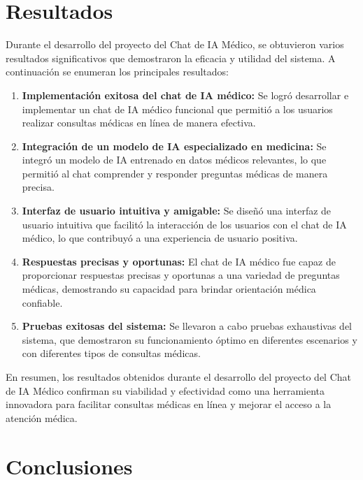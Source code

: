 \documentclass[conference]{IEEEtran}
\begin{document}
\section{Resultados}

Durante el desarrollo del proyecto del Chat de IA Médico, se obtuvieron varios resultados significativos que demostraron la eficacia y utilidad del sistema. A continuación se enumeran los principales resultados:

\begin{enumerate}
    \item \textbf{Implementación exitosa del chat de IA médico:} Se logró desarrollar e implementar un chat de IA médico funcional que permitió a los usuarios realizar consultas médicas en línea de manera efectiva.
    
    \item \textbf{Integración de un modelo de IA especializado en medicina:} Se integró un modelo de IA entrenado en datos médicos relevantes, lo que permitió al chat comprender y responder preguntas médicas de manera precisa.
    
    \item \textbf{Interfaz de usuario intuitiva y amigable:} Se diseñó una interfaz de usuario intuitiva que facilitó la interacción de los usuarios con el chat de IA médico, lo que contribuyó a una experiencia de usuario positiva.
    
    \item \textbf{Respuestas precisas y oportunas:} El chat de IA médico fue capaz de proporcionar respuestas precisas y oportunas a una variedad de preguntas médicas, demostrando su capacidad para brindar orientación médica confiable.
    
    \item \textbf{Pruebas exitosas del sistema:} Se llevaron a cabo pruebas exhaustivas del sistema, que demostraron su funcionamiento óptimo en diferentes escenarios y con diferentes tipos de consultas médicas.
\end{enumerate}


En resumen, los resultados obtenidos durante el desarrollo del proyecto del Chat de IA Médico confirman su viabilidad y efectividad como una herramienta innovadora para facilitar consultas médicas en línea y mejorar el acceso a la atención médica.

\section{Conclusiones}
\end{document}
